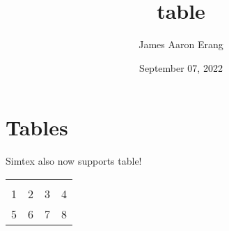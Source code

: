 \documentclass[12pt, UTF8]{article}
\title{table}
\author{James Aaron Erang}
\date{September 07, 2022}
\begin{document}
	\maketitle
	
	\section{Tables}
	
	Simtex also now supports table!
	
	\begin{center}
		\begin{tabular}{c | c | c | c}
			\hline \\
			1 & 2 & 3 & 4 \\
			5 & 6 & 7 & 8 \\
		\end{tabular}
	\end{center}
\end{document}
